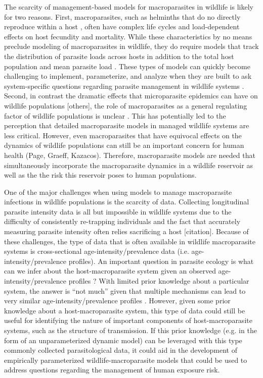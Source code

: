 \documentclass[11pt]{article}
\begin{document}
The scarcity of management-based models for macroparasites in wildlife is likely for two reasons. First, macroparasites, such as helminths that do no directly reproduce within a host \citep{AndersonandMay1979}, often have complex life cycles and load-dependent effects on host fecundity and mortality. While these characteristics by no means preclude modeling of macroparasites in wildlife, they do require models that track the distribution of parasite loads across hosts in addition to the total host population and mean parasite load \citep{AndersonandMay1978,Cornell2010}.  These types of models can quickly become challenging to implement, parameterize, and analyze when they are built to ask system-specific questions regarding parasite management in wildlife systems \citep{McCallum2017}.  Second, in contrast the dramatic effects that microparasite epidemics can have on wildlife populations \citep[e.g.][]{Webb2006,Hewson2014} [others], the role of macroparasites as a general regulating factor of wildlife populations is unclear \citep{Tompkins2002,Tompkins2011}. This has potentially led to the perception that detailed macroparasite models in managed wildlife systems are less critical. However, even macroparasites that have equivocal effects on the dynamics of wildlife populations can still be an important concern for human health (Page, Graeff, Kazacos). Therefore, macroparasite models are needed that simultaneously incorporate the macroparasite dynamics in a wildlife reservoir as well as the the risk this reservoir poses to human populations.  

One of the major challenges when using models to manage macroparasite infections in wildlife populations is the scarcity of data.  Collecting longitudinal parasite intensity data is all but impossible in wildlife systems due to the difficulty of consistently re-trapping individuals and the fact that accurately measuring parasite intensity often relies sacrificing a host [citation].  Because of these challenges, the type of data that is often available in wildlife macroparasite systems is cross-sectional age-intensity/prevalence data (i.e. age-intensity/prevalence profiles).  An important question in parasite ecology is what can we infer about the host-macroparasite system given an observed age-intensity/prevalence profiles \citep{Pacala1988,Wilson2002,Duerr2003}? With limited prior knowledge about a particular system, the answer is ``not much'' given that multiple mechanisms can lead to very similar age-intensity/prevalence profiles \citep{Wilson2002,Duerr2003}.  However, given some prior knowledge about a host-macroparasite system, this type of data could still be useful for identifying the nature of important components of host-macroparasite systems, such as the structure of transmission.  If this prior knowledge (e.g. in the form of an unparameterized dynamic model) can be leveraged with this type commonly collected parasitological data, it could aid in the development of empirically parameterized wildlife-macroparasite models that could be used to address questions regarding the management of human exposure risk. 
\end{document}
